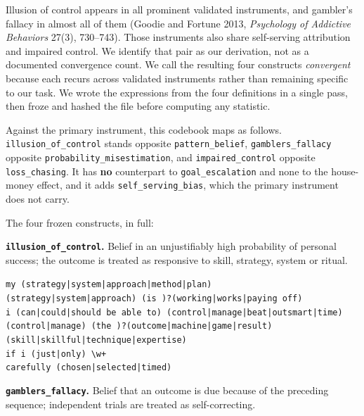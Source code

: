 Illusion of control appears in all prominent validated instruments, and gambler's fallacy in
almost all of them (Goodie and Fortune 2013, \emph{Psychology of Addictive Behaviors} 27(3),
730--743). Those instruments also share self-serving attribution and impaired control. We identify
that pair as our derivation, not as a documented convergence count. We call the resulting four
constructs \emph{convergent} because each recurs across validated instruments rather than
remaining specific to our task. We wrote the expressions from the four definitions in a single
pass, then froze and hashed the file before computing any statistic.

Against the primary instrument, this codebook maps as follows.
\texttt{illusion\_of\_control} stands opposite \texttt{pattern\_belief},
\texttt{gamblers\_fallacy} opposite \texttt{probability\_misestimation}, and
\texttt{impaired\_control} opposite \texttt{loss\_chasing}. It has \textbf{no} counterpart to
\texttt{goal\_escalation} and none to the house-money effect, and it adds
\texttt{self\_serving\_bias}, which the primary instrument does not carry.

\vspace{0.4em}
\noindent The four frozen constructs, in full:

\noindent\textbf{\texttt{illusion\_of\_control}.} Belief in an unjustifiably high probability of
personal success; the outcome is treated as responsive to skill, strategy, system or ritual.

\begin{flushleft}\small
\verb+my (strategy|system|approach|method|plan)+\\
\verb+(strategy|system|approach) (is )?(working|works|paying off)+\\
\verb+i (can|could|should be able to) (control|manage|beat|outsmart|time)+\\
\verb+(control|manage) (the )?(outcome|machine|game|result)+\\
\verb+(skill|skillful|technique|expertise)+\\
\verb!if i (just|only) \w+!\\
\verb+carefully (chosen|selected|timed)+
\end{flushleft}

\vspace{0.5em}
\noindent\textbf{\texttt{gamblers\_fallacy}.} Belief that an outcome is due because of the
preceding sequence; independent trials are treated as self-correcting.

